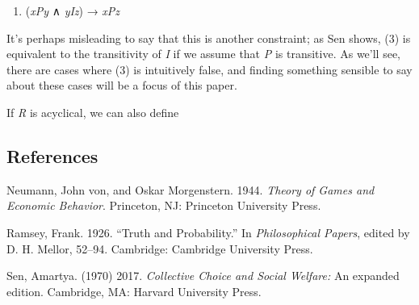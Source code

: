 \documentclass[
  12pt,
  letterpaper,
  DIV=11,
  numbers=noendperiod]{scrartcl}
\newlength{\cslhangindent}
\newenvironment{CSLReferences}[2] %
 {\begin{list}{}{%
  \setlength{\itemindent}{0pt}
  \setlength{\leftmargin}{0pt}
  \setlength{\parsep}{0pt}
  \ifodd #1
   \setlength{\leftmargin}{\cslhangindent}
   \setlength{\itemindent}{-1\cslhangindent}
  \fi
  \setlength{\itemsep}{#2\baselineskip}}}
 {\end{list}}
\providecommand{\tightlist}{%
  \setlength{\itemsep}{0pt}\setlength{\parskip}{0pt}}
\begin{document}
\begin{enumerate}
\def\labelenumi{(\arabic{enumi})}
\setcounter{enumi}{2}
\tightlist
\item
  (\emph{xPy} ∧ \emph{yIz}) → \emph{xPz}
\end{enumerate}

It's perhaps misleading to say that this is another constraint; as Sen
shows, (3) is equivalent to the transitivity of \emph{I} if we assume
that \emph{P} is transitive. As we'll see, there are cases where (3) is
intuitively false, and finding something sensible to say about these
cases will be a focus of this paper.

If \emph{R} is acyclical, we can also define

\subsection*{References}\label{references}

\label{refs}
\begin{CSLReferences}{1}{0}
Neumann, John von, and Oskar Morgenstern. 1944. \emph{Theory of Games
and Economic Behavior}. Princeton, NJ: Princeton University Press.

Ramsey, Frank. 1926. {``Truth and Probability.''} In \emph{Philosophical
Papers}, edited by D. H. Mellor, 52--94. Cambridge: Cambridge University
Press.

Sen, Amartya. (1970) 2017. \emph{Collective Choice and Social Welfare:}
An expanded edition. Cambridge, MA: Harvard University Press.

\end{CSLReferences}
\end{document}
